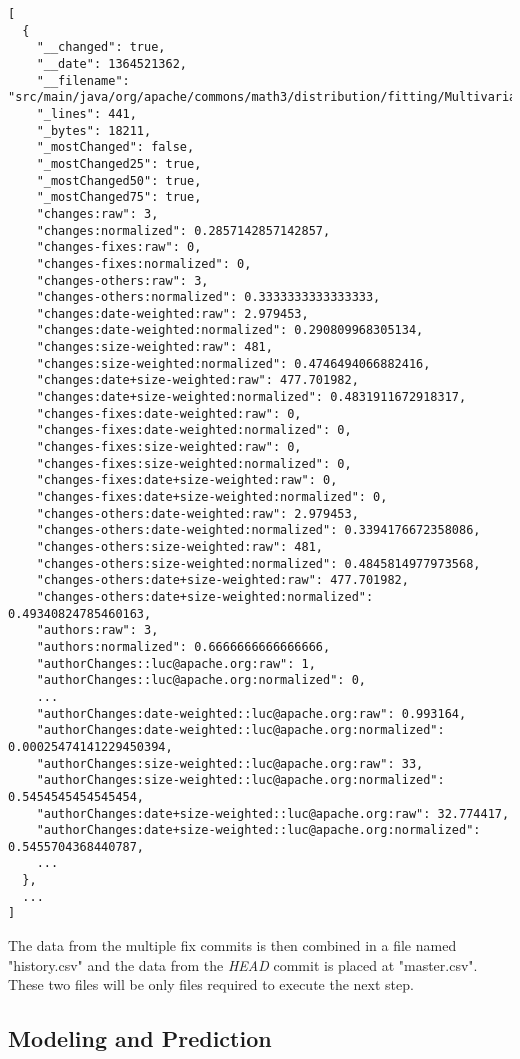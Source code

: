 \begin{lstlisting}
[
  {
    "__changed": true,
    "__date": 1364521362,
    "__filename": "src/main/java/org/apache/commons/math3/distribution/fitting/MultivariateNormalMixtureExpectationMaximization.java",
    "_lines": 441,
    "_bytes": 18211,
    "_mostChanged": false,
    "_mostChanged25": true,
    "_mostChanged50": true,
    "_mostChanged75": true,
    "changes:raw": 3,
    "changes:normalized": 0.2857142857142857,
    "changes-fixes:raw": 0,
    "changes-fixes:normalized": 0,
    "changes-others:raw": 3,
    "changes-others:normalized": 0.3333333333333333,
    "changes:date-weighted:raw": 2.979453,
    "changes:date-weighted:normalized": 0.290809968305134,
    "changes:size-weighted:raw": 481,
    "changes:size-weighted:normalized": 0.4746494066882416,
    "changes:date+size-weighted:raw": 477.701982,
    "changes:date+size-weighted:normalized": 0.4831911672918317,
    "changes-fixes:date-weighted:raw": 0,
    "changes-fixes:date-weighted:normalized": 0,
    "changes-fixes:size-weighted:raw": 0,
    "changes-fixes:size-weighted:normalized": 0,
    "changes-fixes:date+size-weighted:raw": 0,
    "changes-fixes:date+size-weighted:normalized": 0,
    "changes-others:date-weighted:raw": 2.979453,
    "changes-others:date-weighted:normalized": 0.3394176672358086,
    "changes-others:size-weighted:raw": 481,
    "changes-others:size-weighted:normalized": 0.4845814977973568,
    "changes-others:date+size-weighted:raw": 477.701982,
    "changes-others:date+size-weighted:normalized": 0.49340824785460163,
    "authors:raw": 3,
    "authors:normalized": 0.6666666666666666,
    "authorChanges::luc@apache.org:raw": 1,
    "authorChanges::luc@apache.org:normalized": 0,
    ...
    "authorChanges:date-weighted::luc@apache.org:raw": 0.993164,
    "authorChanges:date-weighted::luc@apache.org:normalized": 0.00025474141229450394,
    "authorChanges:size-weighted::luc@apache.org:raw": 33,
    "authorChanges:size-weighted::luc@apache.org:normalized": 0.5454545454545454,
    "authorChanges:date+size-weighted::luc@apache.org:raw": 32.774417,
    "authorChanges:date+size-weighted::luc@apache.org:normalized": 0.5455704368440787,
    ...
  },
  ...
]
\end{lstlisting}


The data from the multiple fix commits is then combined in a file named "history.csv" and the data from the \emph{HEAD} commit is placed at "master.csv". 
These two files will be only files required to execute the next step.


\subsection{Modeling and Prediction}

